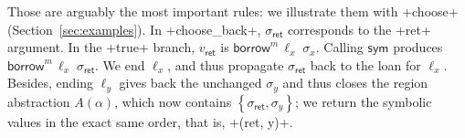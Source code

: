 \documentclass[acmsmall,screen]{acmart}
\newif\iflong
\newcommand{\sref}[1]{Section~\ref{sec:#1}}
\newcommand\kw[1]{\ensuremath{\mathsf{#1}}}
\newcommand\tmbrw[2]{\ensuremath{\mathsf{\&}^#1\mathsf{mut}\,#2}}
\newcommand\emborrow[2]{\ensuremath{\mathsf{borrow}^m\,#1\;#2}}
\begin{document}
\iflong
\newcommand\ksym{\kw{sym}}
\begin{figure}
  \centering
  \smaller
  \[
  \begin{array}[h]{lllr}
    \ksym(\alpha,(\vec\sigma),(\vec v)) & = & (\overrightarrow{\ksym(\alpha,\sigma,v)}) \\
    \ksym(\alpha,\sigma,\emborrow\ell v: \tmbrw\alpha\tau) & = & \emborrow\ell\sigma \\
    \ksym(\alpha,\_,\emborrow\ell v: \tmbrw{\beta}\tau) & = & \bot & \qquad \alpha \neq \beta
  \end{array}
  \]
  \caption{The $\kw{sym}$ function, used for the generation of backward
  functions. Specifically, $\kw{sym}(\alpha,\sigma,v)$ models the caller invoking
  the backward function for $\alpha$ with the value originally returned by the
  forward function to said caller. We abstract away the concrete view of the
  return value ($v$) into a symbolic view (modeled by $\sigma$) -- essentially
  saying that the caller may have arbitrarily mutated the return value while it
  owned it.}
  \label{fig:sym}
\end{figure}
\fi

Those are arguably the most important rules: we illustrate them with \li+choose+
(\sref{examples}).
In \li+choose_back+, $\sigma_\mathsf{ret}$ corresponds to the \li+ret+ argument.
In the \li+true+ branch, $v_\mathsf{ret}$ is $\emborrow{\ell_x}{\sigma_x}$.
Calling $\kw{sym}$ produces $\emborrow{\ell_x}{\sigma_\mathsf{ret}}$. We end
$\ell_x$, and thus propagate $\sigma_\mathsf{ret}$ back to the loan for
$\ell_x$. Besides, ending $\ell_y$ gives back the unchanged $\sigma_y$ and thus
closes the region abstraction $A(\alpha)$, which now contains $\left\{
\sigma_\mathsf{ret}, \sigma_y \right\}$; we return the symbolic values in the
exact same order, that is, \li+(ret, y)+.
\end{document}
